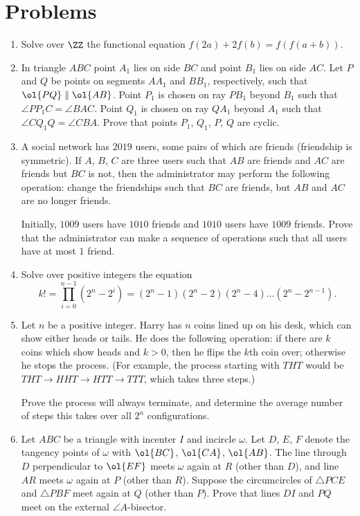 \documentclass[11pt]{scrartcl}
\begin{document}
\section{Problems}
\begin{enumerate}[\bfseries 1.]
\item %
Solve over $\ZZ$ the functional equation
$f(2a) + 2f(b) = f(f(a+b))$.

\item %
In triangle $ABC$ point $A_1$ lies on side $BC$
and point $B_1$ lies on side $AC$.
Let $P$ and $Q$ be points on segments $AA_1$ and $BB_1$,
respectively, such that $\ol{PQ} \parallel \ol{AB}$.
Point $P_1$ is chosen on ray $PB_1$ beyond $B_1$
such that $\angle PP_1C = \angle BAC$.
Point $Q_1$ is chosen on ray $QA_1$ beyond $A_1$
such that $\angle CQ_1Q = \angle CBA$.
Prove that points $P_1$, $Q_1$, $P$, $Q$ are cyclic.

\item %
A social network has $2019$ users,
some pairs of which are friends (friendship is symmetric).
If $A$, $B$, $C$ are three users such that
$AB$ are friends and $AC$ are friends but $BC$ is not,
then the administrator may perform the following operation:
change the friendships such that $BC$ are friends,
but $AB$ and $AC$ are no longer friends.

Initially, $1009$ users have $1010$ friends
and $1010$ users have $1009$ friends.
Prove that the administrator can make a sequence of operations
such that all users have at most $1$ friend.

\item %
Solve over positive integers the equation
\[ k! = \prod_{i=0}^{n-1} (2^n-2^i)
  = (2^n-1)(2^n-2)(2^n-4) \dots (2^n-2^{n-1}). \]

\item %
Let $n$ be a positive integer.
Harry has $n$ coins lined up on his desk,
which can show either heads or tails.
He does the following operation:
if there are $k$ coins which show heads and $k > 0$,
then he flips the $k$th coin over;
otherwise he stops the process.
(For example, the process starting with $THT$ would be
$THT \to HHT \to HTT \to TTT$, which takes three steps.)

Prove the process will always terminate,
and determine the average number of steps
this takes over all $2^n$ configurations.

\item %
Let $ABC$ be a triangle with incenter $I$ and incircle $\omega$.
Let $D$, $E$, $F$ denote the tangency points of $\omega$
with $\ol{BC}$, $\ol{CA}$, $\ol{AB}$.
The line through $D$ perpendicular to $\ol{EF}$
meets $\omega$ again at $R$ (other than $D$),
and line $AR$ meets $\omega$ again at $P$ (other than $R$).
Suppose the circumcircles of $\triangle PCE$ and $\triangle PBF$
meet again at $Q$ (other than $P$).
Prove that lines $DI$ and $PQ$ meet on the external $\angle A$-bisector.

\end{enumerate}
\pagebreak
\end{document}
